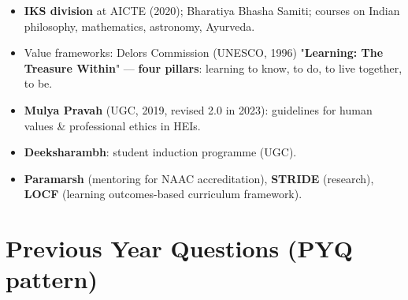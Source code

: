 \begin{itemize}
\tightlist
\item
  \textbf{IKS division} at AICTE (2020); Bharatiya Bhasha Samiti; courses on Indian philosophy, mathematics, astronomy, Ayurveda.
\item
  Value frameworks: Delors Commission (UNESCO, 1996) "\textbf{Learning: The Treasure Within}" --- \textbf{four pillars}: learning to know, to do, to live together, to be.
\item
  \textbf{Mulya Pravah} (UGC, 2019, revised 2.0 in 2023): guidelines for human values \& professional ethics in HEIs.
\item
  \textbf{Deeksharambh}: student induction programme (UGC).
\item
  \textbf{Paramarsh} (mentoring for NAAC accreditation), \textbf{STRIDE} (research), \textbf{LOCF} (learning outcomes-based curriculum framework).
\end{itemize}

\needspace{95pt}

\hypertarget{p1-10--previous-year-questions-pyq-pattern}{%
\section{Previous Year Questions (PYQ pattern)}\label{p1-10--previous-year-questions-pyq-pattern}}

